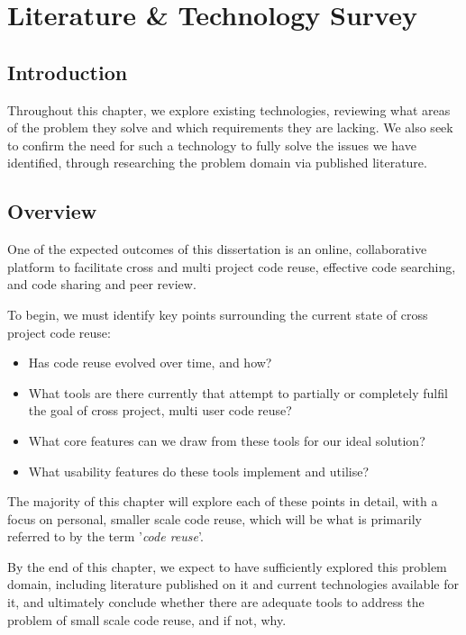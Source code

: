 \chapter{Literature \& Technology Survey}
\section{Introduction}
Throughout this chapter, we explore existing technologies, reviewing what areas of the problem they solve and which requirements they are lacking. We also seek to confirm the need for such a technology to fully solve the issues we have identified, through researching the problem domain via published literature.

\section{Overview}
One of the expected outcomes of this dissertation is an online, collaborative platform to facilitate cross and multi project code reuse, effective code searching, and code sharing and peer review.

To begin, we must identify key points surrounding the current state of cross project code reuse:


\begin{itemize}
\item Has code reuse evolved over time, and how?
\item What tools are there currently that attempt to partially or completely fulfil the goal of cross project, multi user code reuse?
\item What core features can we draw from these tools for our ideal solution?
\item What usability features do these tools implement and utilise?
\end{itemize}


The majority of this chapter will explore each of these points in detail, with a focus on personal, smaller scale code reuse, which will be what is primarily referred to by the term '\textit{code reuse}'. 

By the end of this chapter, we expect to have sufficiently explored this problem domain, including literature published on it and current technologies available for it, and ultimately conclude whether there are adequate tools to address the problem of small scale code reuse, and if not, why.

